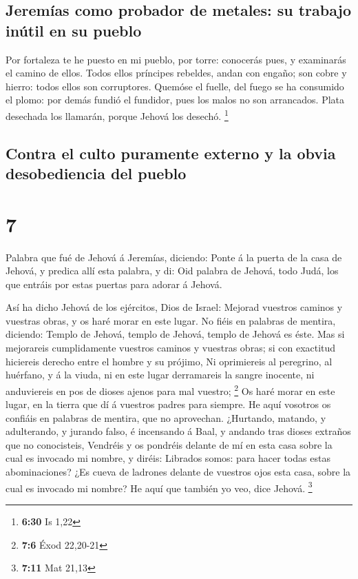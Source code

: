 \hypertarget{jeremuxedas-como-probador-de-metales-su-trabajo-inuxfatil-en-su-pueblo}{%
\subsection{Jeremías como probador de metales: su trabajo inútil en su
pueblo}\label{jeremuxedas-como-probador-de-metales-su-trabajo-inuxfatil-en-su-pueblo}}

 Por fortaleza te he puesto en mi pueblo, por torre:
conocerás pues, y examinarás el camino de ellos.  Todos
ellos príncipes rebeldes, andan con engaño; son cobre y hierro: todos
ellos son corruptores.  Quemóse el fuelle, del fuego se ha
consumido el plomo: por demás fundió el fundidor, pues los malos no son
arrancados.  Plata desechada los llamarán, porque Jehová
los desechó. \footnote{\textbf{6:30} Is 1,22}

\hypertarget{contra-el-culto-puramente-externo-y-la-obvia-desobediencia-del-pueblo}{%
\subsection{Contra el culto puramente externo y la obvia desobediencia
del
pueblo}\label{contra-el-culto-puramente-externo-y-la-obvia-desobediencia-del-pueblo}}

\hypertarget{section-6}{%
\section{7}\label{section-6}}

 Palabra que fué de Jehová á Jeremías, diciendo:
 Ponte á la puerta de la casa de Jehová, y predica allí esta
palabra, y di: Oid palabra de Jehová, todo Judá, los que entráis por
estas puertas para adorar á Jehová.

 Así ha dicho Jehová de los ejércitos, Dios de Israel:
Mejorad vuestros caminos y vuestras obras, y os haré morar en este
lugar.  No fiéis en palabras de mentira, diciendo: Templo de
Jehová, templo de Jehová, templo de Jehová es éste.  Mas si
mejorareis cumplidamente vuestros caminos y vuestras obras; si con
exactitud hiciereis derecho entre el hombre y su prójimo, 
Ni oprimiereis al peregrino, al huérfano, y á la viuda, ni en este lugar
derramareis la sangre inocente, ni anduviereis en pos de dioses ajenos
para mal vuestro; \footnote{\textbf{7:6} Éxod 22,20-21}  Os
haré morar en este lugar, en la tierra que dí á vuestros padres para
siempre.  He aquí vosotros os confiáis en palabras de
mentira, que no aprovechan.  ¿Hurtando, matando, y
adulterando, y jurando falso, é incensando á Baal, y andando tras dioses
extraños que no conocisteis,  Vendréis y os pondréis
delante de mí en esta casa sobre la cual es invocado mi nombre, y
diréis: Librados somos: para hacer todas estas abominaciones?
 ¿Es cueva de ladrones delante de vuestros ojos esta casa,
sobre la cual es invocado mi nombre? He aquí que también yo veo, dice
Jehová. \footnote{\textbf{7:11} Mat 21,13}

